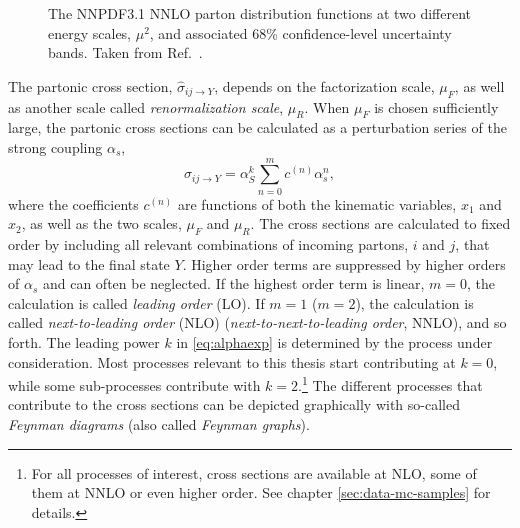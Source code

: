 \begin{figure}
  \caption[The NNPDF3.1 NNLO parton distribution functions at two different energy scales, $\mu^2$, and associated 68\% confidence-level uncertainty bands.]{The NNPDF3.1 NNLO parton distribution functions at two different energy scales, $\mu^2$, and associated 68\% confidence-level uncertainty bands. Taken from Ref.~\cite{2017NNPDF}.}
  \label{fig:pdfs}
\end{figure}

The partonic cross section, $\hat{\sigma}_{ij \rightarrow Y}$, depends on the factorization scale, $\mu_F$, as well as another scale called \emph{renormalization scale}, $\mu_R$.
When $\mu_F$ is chosen sufficiently large, the partonic cross sections can be calculated as a perturbation series of the strong coupling $\alpha_s$,
\begin{equation}
  \hat{\sigma}_{ij \rightarrow Y} = \alpha^k_S \sum_{n=0}^{m} c^{(n)}\alpha_s^n,
  \label{eq:alphaexp}
\end{equation}
where the coefficients $c^{(n)}$ are functions of both the kinematic variables, $x_1$ and $x_2$, as well as the two scales, $\mu_F$ and $\mu_R$. The cross sections are calculated to fixed order by including all relevant combinations of incoming partons, $i$ and $j$, that may lead to the final state $Y$. Higher order terms are suppressed by higher orders of $\alpha_s$ and can often be neglected.
If the highest order term is linear, $m=0$, the calculation is called \emph{leading order} (LO). If $m=1$ ($m=2$), the calculation is called \emph{next-to-leading order} (NLO) (\emph{next-to-next-to-leading order}, NNLO), and so forth. 
The leading power $k$ in \cref{eq:alphaexp} is determined by the process under consideration. Most processes relevant to this thesis start contributing at $k=0$, while some sub-processes contribute with $k=2$.\footnote{For all processes of interest, cross sections are available at NLO, some of them at NNLO or even higher order. See chapter \cref{sec:data-mc-samples} for details.}
The different processes that contribute to the cross sections can be depicted graphically with so-called \emph{Feynman diagrams} (also called \emph{Feynman graphs}). 
